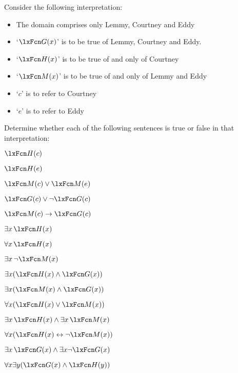 \problempart
\label{pr.TorF2}
Consider the following interpretation:	
	\begin{itemize}
		\item The domain comprises only Lemmy, Courtney and Eddy
		\item `$\atom{G}{x}$' is to be true of Lemmy, Courtney and Eddy.
		\item `$\atom{H}{x}$' is to be true of and only of Courtney
		\item `$\atom{M}{x}$' is to be true of and only of Lemmy and Eddy
		\item `$c$' is to refer to Courtney
		\item `$e$' is to refer to Eddy
	\end{itemize}
Determine whether each of the following sentences is true or false in that interpretation:
\begin{compactlist}
\item $\atom{H}{c} $
\item $\atom{H}{e} $
\item $\atom{M}{c}  \eor \atom{M}{e}$
\item $\atom{G}{c}  \eor \enot \atom{G}{c}$
\item $\atom{M}{c}  \eif \atom{G}{c}$
\item $\exists x\, \atom{H}{x}$
\item $\forall x\, \atom{H}{x}$
\item $\exists x\, \enot \atom{M}{x}$
\item $\exists x(\atom{H}{x} \eand \atom{G}{x})$
\item $\exists x(\atom{M}{x} \eand \atom{G}{x})$
\item $\forall x(\atom{H}{x} \eor \atom{M}{x})$
\item $\exists x\, \atom{H}{x} \eand \exists x\, \atom{M}{x}$
\item $\forall x(\atom{H}{x} \eiff \enot \atom{M}{x})$
\item $\exists x\, \atom{G}{x} \eand \exists x \enot \atom{G}{x}$
\item $\forall x\exists y(\atom{G}{x} \eand \atom{H}{y})$
\end{compactlist}

